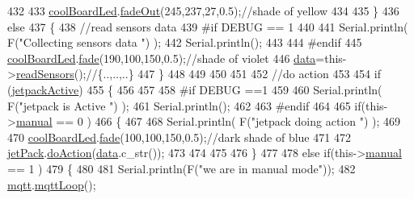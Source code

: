 \begin{DoxyCode}
432         
433         \hyperlink{class_cool_board_a1b1d3c684a5baa56b08486e192fd8e97}{coolBoardLed}.\hyperlink{class_cool_board_led_a93d545679237e8cc858324367149775c}{fadeOut}(245,237,27,0.5);\textcolor{comment}{//shade of yellow}
434                 
435     \}   
436     \textcolor{keywordflow}{else}
437     \{
438         \textcolor{comment}{//read sensors data}
439 \textcolor{preprocessor}{    #if DEBUG == 1}
440 
441         Serial.println( F(\textcolor{stringliteral}{"Collecting sensors data "}) );
442         Serial.println();
443     
444 \textcolor{preprocessor}{    #endif}
445         \hyperlink{class_cool_board_a1b1d3c684a5baa56b08486e192fd8e97}{coolBoardLed}.\hyperlink{class_cool_board_led_af1cacbaa88db8bcf6042c1083ba41155}{fade}(190,100,150,0.5);\textcolor{comment}{//shade of violet        }
446         \hyperlink{class_cool_board_a427fb753dd8575bdf821c70a5c63d695}{data}=this->\hyperlink{class_cool_board_ad03abdce2e65f520bbf2cff0f2d083cf}{readSensors}();\textcolor{comment}{//\{..,..,..\}}
447     \}
448     
449 
450 
451 
452     \textcolor{comment}{//do action}
453 
454     \textcolor{keywordflow}{if} (\hyperlink{class_cool_board_a9be03a913d26e558328935ca3b59a75e}{jetpackActive})
455     \{
456 
457 
458 \textcolor{preprocessor}{    #if DEBUG ==1}
459 
460         Serial.println( F(\textcolor{stringliteral}{"jetpack is Active "}) );
461         Serial.println();
462 
463 \textcolor{preprocessor}{    #endif}
464     
465         \textcolor{keywordflow}{if}(this->\hyperlink{class_cool_board_a7c8e505a5804b109e112d5a03df6ea2b}{manual} == 0 )
466         \{
467 
468             Serial.println( F(\textcolor{stringliteral}{"jetpack doing action "}) );
469 
470             \hyperlink{class_cool_board_a1b1d3c684a5baa56b08486e192fd8e97}{coolBoardLed}.\hyperlink{class_cool_board_led_af1cacbaa88db8bcf6042c1083ba41155}{fade}(100,100,150,0.5);\textcolor{comment}{//dark shade of blue     }
471 
472             \hyperlink{class_cool_board_a30b1357881b01ccbec676856a91e48e9}{jetPack}.\hyperlink{class_jetpack_a9e703197093094b963f9ad57817495b8}{doAction}(\hyperlink{class_cool_board_a427fb753dd8575bdf821c70a5c63d695}{data}.c\_str());
473             
474 
475         
476         \}
477         
478         \textcolor{keywordflow}{else} \textcolor{keywordflow}{if}(this->\hyperlink{class_cool_board_a7c8e505a5804b109e112d5a03df6ea2b}{manual} == 1 )
479         \{
480         
481             Serial.println(F(\textcolor{stringliteral}{"we are in manual mode"}));
482             \hyperlink{class_cool_board_a2399f44d7c23c1149a335cb3b46d90f1}{mqtt}.\hyperlink{class_cool_m_q_t_t_aa5eaae967b562b62cbcf2b8d81f6e5d5}{mqttLoop}();

\end{DoxyCode}
